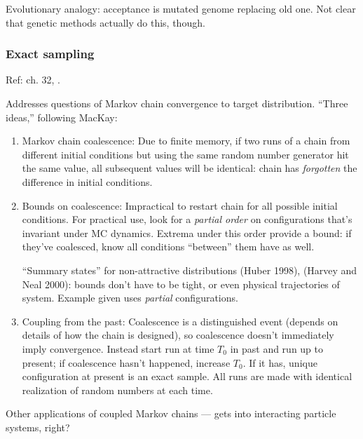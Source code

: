 \documentclass[notitlepage,openany,11pt]{report}
\theoremstyle{plain}%
\numberwithin{equation}{section}
\begin{document}
Evolutionary analogy: acceptance is mutated genome replacing old one. Not clear that genetic methods actually do this, though. 

\subsubsection{Exact sampling} 
Ref: \cite{MacKay:03} ch. 32, \cite{ProppWilson:96}. 

Addresses questions of Markov chain convergence to target distribution. ``Three ideas,'' following MacKay:
\begin{enumerate}
\item Markov chain coalescence: Due to finite memory, if two runs of a chain from different initial conditions but using the same random number generator  hit the same value, all subsequent values will be identical: chain has \textit{forgotten} the difference in initial conditions.

\item Bounds on coalescence: Impractical to restart chain for all possible initial conditions. For practical use, look for a \textit{partial order} on configurations that's invariant under MC dynamics. Extrema under this order provide a bound: if they've coalesced, know all conditions ``between'' them have as well. 

``Summary states'' for non-attractive distributions (Huber 1998), (Harvey and Neal 2000): bounds don't have to be tight, or even physical trajectories of system. Example given uses \textit{partial} configurations. 

\item Coupling from the past: Coalescence is a distinguished event (depends on details of how the chain is designed), so coalescence doesn't immediately imply convergence. Instead start run at time $T_{0}$ in past and run up to present;  if coalescence hasn't happened, increase $T_{0}$. If it has, unique configuration at present is an exact sample. All runs are made with identical realization of random numbers at each time. 

\end{enumerate}

Other applications of coupled Markov chains --- gets into interacting particle systems, right?
\end{document}
